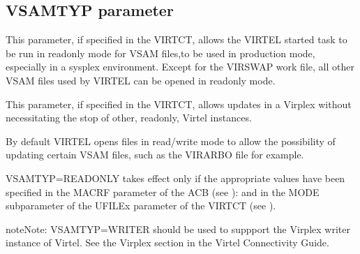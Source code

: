 \documentclass[letterpaper,10pt,english]{sphinxmanual}
\begin{document}
\subsection{VSAMTYP parameter}
\label{\detokenize{Installation_Guide:vsamtyp-parameter}}\label{\detokenize{Installation_Guide:index-138}}
\begin{sphinxVerbatim}[commandchars=\\\{\}]
\PYG{p}{[}\PYG{p}{]} 
\end{sphinxVerbatim}

\sphinxAtStartPar
{} \sphinxhyphen{} This parameter, if specified in the VIRTCT, allows the VIRTEL started task to be run in read\sphinxhyphen{}only mode for VSAM files,to be used in production mode, especially in a sysplex environment. Except for the VIRSWAP work file, all other VSAM files used by VIRTEL can be opened in read\sphinxhyphen{}only mode.

\sphinxAtStartPar
{} \sphinxhyphen{} This parameter, if specified in the VIRTCT, allows updates in a Virplex without necessitating the stop of other, read\sphinxhyphen{}only, Virtel instances.

\sphinxAtStartPar
{} \sphinxhyphen{} By default VIRTEL opens files in read/write mode to allow the possibility of updating certain VSAM files, such as the VIRARBO file for example.

\sphinxAtStartPar
VSAMTYP=READONLY takes effect only if the appropriate values have been specified in the MACRF parameter of the ACB (see {\hyperref[\detokenize{Installation_Guide:v461ig-additional-parameters-for-vsam-files}]{}}): and in the MODE subparameter of the UFILEx parameter of the VIRTCT (see {\hyperref[\detokenize{Installation_Guide:v461ig-ufile1-to-ufile20-parameters}]{}}).

\begin{sphinxadmonition}{note}{Note:}
\sphinxAtStartPar
VSAMTYP=WRITER should be used to suppport the Virplex writer instance of Virtel. See the Virplex section in the Virtel Connectivity Guide.
\end{sphinxadmonition}

\ignorespaces 
\end{document}
